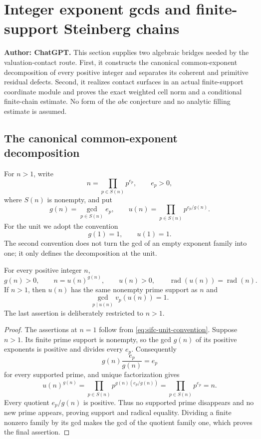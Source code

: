 \section{Integer exponent gcds and finite-support Steinberg chains}
\label{sec:steinberg-integer-finite-chain}

\noindent\textbf{Author: ChatGPT.}
This section supplies two algebraic bridges needed by the valuation-contact
route.  First, it constructs the canonical common-exponent decomposition of
every positive integer and separates its coherent and primitive residual
defects.  Second, it realizes contact surfaces in an actual finite-support
coordinate module and proves the exact weighted cell norm and a conditional
finite-chain estimate.  No form of the $abc$ conjecture and no analytic
filling estimate is assumed.

\subsection{The canonical common-exponent decomposition}

For $n>1$, write
\[
 n=\prod_{p\in S(n)}p^{e_p},
 \qquad e_p>0,
\]
where $S(n)$ is nonempty, and put
\begin{equation}
 g(n)=\gcd_{p\in S(n)}e_p,
 \qquad
 u(n)=\prod_{p\in S(n)}p^{e_p/g(n)}.
 \label{eq:sifc-gcd-base}
\end{equation}
For the unit we adopt the convention
\begin{equation}
 g(1)=1,\qquad u(1)=1.
 \label{eq:sifc-unit-convention}
\end{equation}
The second convention does not turn the gcd of an empty exponent family
into one; it only defines the decomposition at the unit.

\begin{proposition}
\label{prop:sifc-integer-decomposition}
For every positive integer $n$,
\[
 g(n)>0,\qquad n=u(n)^{g(n)},\qquad u(n)>0,
 \qquad \operatorname{rad}(u(n))=\operatorname{rad}(n).
\]
If $n>1$, then $u(n)$ has the same nonempty prime support as $n$ and
\[
 \gcd_{p\mid u(n)}v_p(u(n))=1.
\]
The last assertion is deliberately restricted to $n>1$.
\end{proposition}

\begin{proof}
The assertions at $n=1$ follow from
\eqref{eq:sifc-unit-convention}.  Suppose $n>1$.  Its finite prime support
is nonempty, so the gcd $g(n)$ of its positive exponents is positive and
divides every $e_p$.  Consequently
\[
 g(n)\frac{e_p}{g(n)}=e_p
\]
for every supported prime, and unique factorization gives
\[
 u(n)^{g(n)}
 =\prod_{p\in S(n)}p^{g(n)(e_p/g(n))}
 =\prod_{p\in S(n)}p^{e_p}=n.
\]
Every quotient $e_p/g(n)$ is positive.  Thus no supported prime disappears
and no new prime appears, proving support and radical equality.  Dividing a
finite nonzero family by its gcd makes the gcd of the quotient family one,
which proves the final assertion.
\end{proof}

